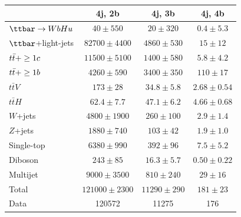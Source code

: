 \begin{table}[htbp]
\small
\begin{center}
\begin{tabular}{l*{3}{c}}
\hline\hline
 & 4j, 2b & 4j, 3b & 4j, 4b \\
\hline
$\Hu$  &   $ 40 \pm 550 $ &   $ 20 \pm 320 $ &   $ 0.4 \pm 5.3 $ \\
\hline
$\ttbar$+light-jets  &   $ 82700 \pm 4400 $ &   $ 4860 \pm 530 $ &   $ 15 \pm 12 $ \\ 
$t\bar{t}+\geq1c$  &   $ 11500 \pm 5100 $ &   $ 1400 \pm 580 $ &   $ 5.8 \pm 4.2 $ \\ 
$t\bar{t}+\geq1b$  &   $ 4260 \pm 590 $ &   $ 3400 \pm 350 $ &   $ 110 \pm 17 $ \\ 
$t\bar{t}V$  &   $ 173 \pm 28 $ &   $ 34.8 \pm 5.8 $ &   $ 2.68 \pm 0.54 $ \\ 
$t\bar{t}H$  &   $ 62.4 \pm 7.7 $ &   $ 47.1 \pm 6.2 $ &   $ 4.66 \pm 0.68 $ \\ 
$W$+jets  &   $ 4800 \pm 1900 $ &   $ 260 \pm 100 $ &   $ 2.9 \pm 1.4 $ \\ 
$Z$+jets  &   $ 1880 \pm 740 $ &   $ 103 \pm 42 $ &   $ 1.9 \pm 1.0 $ \\ 
Single-top  &   $ 6380 \pm 990 $ &   $ 392 \pm 96 $ &   $ 7.5 \pm 5.2 $ \\ 
Diboson  &   $ 243 \pm 85 $ &   $ 16.3 \pm 5.7 $ &   $ 0.50 \pm 0.22 $ \\ 
Multijet  &   $ 9000 \pm 3500 $ &   $ 810 \pm 240 $ &   $ 29 \pm 16 $ \\ 
\hline
Total &   $ 121000 \pm 2300 $ &   $ 11290 \pm 290 $ &   $ 181 \pm 23 $ \\ 
\hline
Data & 120572  & 11275  & 176  \\ 
\hline\hline      
\end{tabular}
\vspace{0.2cm}


\end{center}
\end{table}
